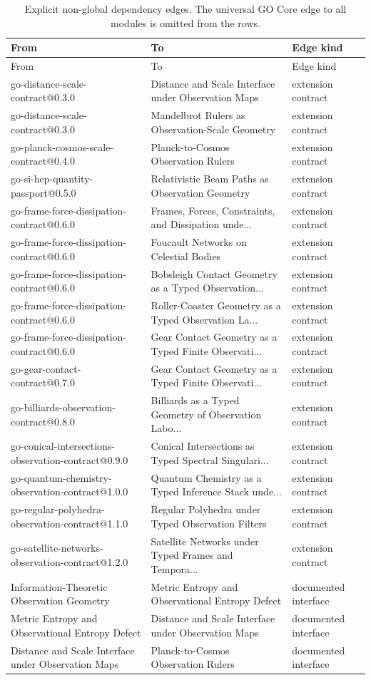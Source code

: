 \begin{longtable}{@{}L{51mm} L{67mm} L{31mm}@{}}
\caption{Explicit non-global dependency edges.  The universal GO Core edge to all modules is omitted from the rows.}\label{tab:dependency-edges}\\
\toprule
From & To & Edge kind\\
\midrule
\endfirsthead
\toprule
From & To & Edge kind\\
\midrule
\endhead
\bottomrule
\endfoot
go-distance-scale-contract@0.3.0 & Distance and Scale Interface under Observation Maps & extension contract\\
go-distance-scale-contract@0.3.0 & Mandelbrot Rulers as Observation-Scale Geometry & extension contract\\
go-planck-cosmos-scale-contract@0.4.0 & Planck-to-Cosmos Observation Rulers & extension contract\\
go-si-hep-quantity-passport@0.5.0 & Relativistic Beam Paths as Observation Geometry & extension contract\\
go-frame-force-dissipation-contract@0.6.0 & Frames, Forces, Constraints, and Dissipation unde... & extension contract\\
go-frame-force-dissipation-contract@0.6.0 & Foucault Networks on Celestial Bodies & extension contract\\
go-frame-force-dissipation-contract@0.6.0 & Bobsleigh Contact Geometry as a Typed Observation... & extension contract\\
go-frame-force-dissipation-contract@0.6.0 & Roller-Coaster Geometry as a Typed Observation La... & extension contract\\
go-frame-force-dissipation-contract@0.6.0 & Gear Contact Geometry as a Typed Finite Observati... & extension contract\\
go-gear-contact-contract@0.7.0 & Gear Contact Geometry as a Typed Finite Observati... & extension contract\\
go-billiards-observation-contract@0.8.0 & Billiards as a Typed Geometry of Observation Labo... & extension contract\\
go-conical-intersections-observation-contract@0.9.0 & Conical Intersections as Typed Spectral Singulari... & extension contract\\
go-quantum-chemistry-observation-contract@1.0.0 & Quantum Chemistry as a Typed Inference Stack unde... & extension contract\\
go-regular-polyhedra-observation-contract@1.1.0 & Regular Polyhedra under Typed Observation Filters & extension contract\\
go-satellite-networks-observation-contract@1.2.0 & Satellite Networks under Typed Frames and Tempora... & extension contract\\
Information-Theoretic Observation Geometry & Metric Entropy and Observational Entropy Defect & documented interface\\
Metric Entropy and Observational Entropy Defect & Distance and Scale Interface under Observation Maps & documented interface\\
Distance and Scale Interface under Observation Maps & Planck-to-Cosmos Observation Rulers & documented interface\\
\end{longtable}
